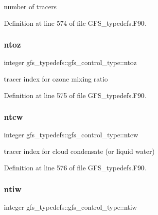 number of tracers 



Definition at line 574 of file G\+F\+S\+\_\+typedefs.\+F90.

\mbox{\label{structgfs__typedefs_1_1gfs__control__type_a519806e65a837e13499fcedb2cf993d9}} 
\subsubsection{ntoz}
{\footnotesize\ttfamily integer gfs\+\_\+typedefs\+::gfs\+\_\+control\+\_\+type\+::ntoz}



tracer index for ozone mixing ratio 



Definition at line 575 of file G\+F\+S\+\_\+typedefs.\+F90.

\mbox{\label{structgfs__typedefs_1_1gfs__control__type_a8790c103ce121805a0dbf94690da827f}} 
\subsubsection{ntcw}
{\footnotesize\ttfamily integer gfs\+\_\+typedefs\+::gfs\+\_\+control\+\_\+type\+::ntcw}



tracer index for cloud condensate (or liquid water) 



Definition at line 576 of file G\+F\+S\+\_\+typedefs.\+F90.

\mbox{\label{structgfs__typedefs_1_1gfs__control__type_a351298cbffb6c58b68774e673d99e61f}} 
\subsubsection{ntiw}
{\footnotesize\ttfamily integer gfs\+\_\+typedefs\+::gfs\+\_\+control\+\_\+type\+::ntiw}




